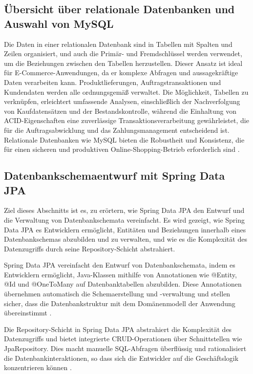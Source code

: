\subsection{Übersicht über relationale Datenbanken und Auswahl von MySQL}
Die Daten in einer relationalen Datenbank sind in Tabellen mit Spalten und Zeilen organisiert, und auch die Primär- und Fremdschlüssel werden verwendet, um die Beziehungen zwischen den Tabellen herzustellen. Dieser Ansatz ist ideal für E-Commerce-Anwendungen, da er komplexe Abfragen und aussagekräftige Daten verarbeiten kann. Produktlieferungen, Auftragstransaktionen und Kundendaten werden alle ordnungsgemäß verwaltet. Die Möglichkeit, Tabellen zu verknüpfen, erleichtert umfassende Analysen, einschließlich der Nachverfolgung von Kaufdatensätzen und der Bestandskontrolle, während die Einhaltung von ACID-Eigenschaften eine zuverlässige Transaktionsverarbeitung gewährleistet, die für die Auftragsabwicklung und das Zahlungsmanagement entscheidend ist. Relationale Datenbanken wie MySQL bieten die Robustheit und Konsistenz, die für einen sicheren und produktiven Online-Shopping-Betrieb erforderlich sind \cite{IBM:o.J}.

\subsection{Datenbankschemaentwurf mit Spring Data JPA}
Ziel dieses Abschnitts ist es, zu erörtern, wie Spring Data JPA den Entwurf und die Verwaltung von Datenbankschemata vereinfacht. Es wird gezeigt, wie Spring Data JPA es Entwicklern ermöglicht, Entitäten und Beziehungen innerhalb eines Datenbankschemas abzubilden und zu verwalten, und wie es die Komplexität des Datenzugriffs durch seine Repository-Schicht abstrahiert.

Spring Data JPA vereinfacht den Entwurf von Datenbankschemata, indem es Entwicklern ermöglicht, Java-Klassen mithilfe von Annotationen wie @Entity, @Id und @OneToMany auf Datenbanktabellen abzubilden. Diese Annotationen übernehmen automatisch die Schemaerstellung und -verwaltung und stellen sicher, dass die Datenbankstruktur mit dem Domänenmodell der Anwendung übereinstimmt \cite{Docs-Spring:o.J, Baeldung:o.J}.

Die Repository-Schicht in Spring Data JPA abstrahiert die Komplexität des Datenzugriffs und bietet integrierte CRUD-Operationen über Schnittstellen wie JpaRepository. Dies macht manuelle SQL-Abfragen überflüssig und rationalisiert die Datenbankinteraktionen, so dass sich die Entwickler auf die Geschäftslogik konzentrieren können \cite{Docs-Spring-JPA-Repo:o.J, Docs-Spring-JPA-QueryMethods:o.J}.

